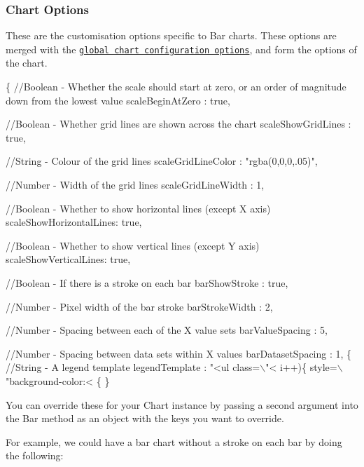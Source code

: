 \subsubsection*{Chart Options}

These are the customisation options specific to Bar charts. These options are merged with the \href{#getting-started-global-chart-configuration}{\tt global chart configuration options}, and form the options of the chart.


\begin{DoxyCode}
\{
    //Boolean - Whether the scale should start at zero, or an order of magnitude down from the lowest value
    scaleBeginAtZero : true,

    //Boolean - Whether grid lines are shown across the chart
    scaleShowGridLines : true,

    //String - Colour of the grid lines
    scaleGridLineColor : "rgba(0,0,0,.05)",

    //Number - Width of the grid lines
    scaleGridLineWidth : 1,

    //Boolean - Whether to show horizontal lines (except X axis)
    scaleShowHorizontalLines: true,

    //Boolean - Whether to show vertical lines (except Y axis)
    scaleShowVerticalLines: true,

    //Boolean - If there is a stroke on each bar
    barShowStroke : true,

    //Number - Pixel width of the bar stroke
    barStrokeWidth : 2,

    //Number - Spacing between each of the X value sets
    barValueSpacing : 5,

    //Number - Spacing between data sets within X values
    barDatasetSpacing : 1,
    \{%
    //String - A legend template
    legendTemplate : "<ul class=\(\backslash\)"<%
       i++)\{%
       style=\(\backslash\)"background-color:<%
    \{%
\}
\end{DoxyCode}


You can override these for your {\ttfamily Chart} instance by passing a second argument into the {\ttfamily Bar} method as an object with the keys you want to override.

For example, we could have a bar chart without a stroke on each bar by doing the following\+:


